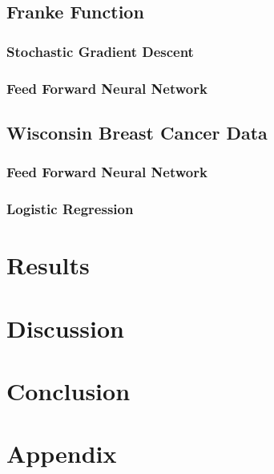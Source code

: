 \documentclass[12pt]{extarticle}
\begin{document}
\subsection{Franke Function}
\subsubsection{Stochastic Gradient Descent}
\subsubsection{Feed Forward Neural Network}

\subsection{Wisconsin Breast Cancer Data}
\subsubsection{Feed Forward Neural Network}
\subsubsection{Logistic Regression}

\section{Results}

%

\section{Discussion}

\section{Conclusion}
\appendix
\section{Appendix}


\end{document}
